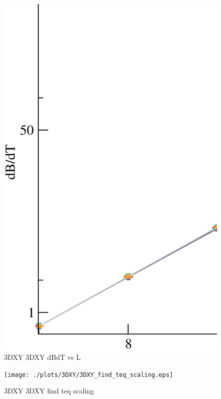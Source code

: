 \begin{figure}[!htpb]
  \centering
  \includegraphics[width=\textwidth]{./plots/3DXY/3DXY_dBdT_vs_L.eps}
  \caption{3DXY 3DXY dBdT vs L}
\end{figure}

\begin{figure}[!htpb]
  \centering
  \texttt{[image: ./plots/3DXY/3DXY\_find\_teq\_scaling.eps]}
  \caption{3DXY 3DXY find teq scaling}
\end{figure}


